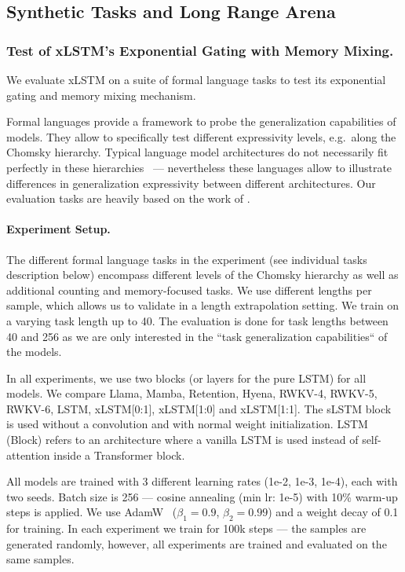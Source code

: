 \documentclass[dvipsnames]{article}
\begin{document}
\begin{appendix}
\subsection{Synthetic Tasks and Long Range Arena}
\label{sec:appExpSynthetic}

\subsubsection{Test of xLSTM's Exponential Gating with Memory Mixing.}\label{sec:appExpSynthetic-formalLang}
We evaluate xLSTM on a suite of formal language tasks to test its exponential gating and memory mixing mechanism.

Formal languages provide a framework to probe the generalization capabilities of models.
They allow to specifically test different expressivity levels, e.g.\ along the Chomsky hierarchy.
Typical language model architectures do not necessarily fit perfectly in these hierarchies~\citep{Deletang:23} --- nevertheless these languages allow to illustrate differences in generalization expressivity between different architectures.
Our evaluation tasks are heavily based on the work of \citet{Deletang:23}.

\paragraph{Experiment Setup.}
The different formal language tasks in the experiment (see individual tasks description below) encompass different levels of the Chomsky hierarchy as well as additional counting and memory-focused tasks.
We use different lengths per sample, which allows us to validate in a length extrapolation setting. 
We train on a varying task length up to 40. The evaluation is done for task lengths between 40 and 256 as we are only interested in the ``task generalization capabilities`` of the models.

In all experiments, we use two blocks (or layers for the pure LSTM) for all models. 
We compare Llama, Mamba, Retention, Hyena, RWKV-4, RWKV-5, RWKV-6, LSTM, xLSTM[0:1], xLSTM[1:0] and xLSTM[1:1].
The sLSTM block is used without a convolution and with normal weight initialization.
LSTM (Block) refers to an architecture where a vanilla LSTM is used instead of self-attention inside a Transformer block.

All models are trained with 3 different learning rates (1e-2, 1e-3, 1e-4), each with two seeds. Batch size is 256 --- cosine annealing (min lr: 1e-5) with 10\% warm-up steps is applied.
We use AdamW~\citep{Loshchilov:19} ($\beta_1 = 0.9$, $\beta_2 = 0.99$) and a weight decay of 0.1 for training.
In each experiment we train for 100k steps --- the samples are generated randomly, however, all experiments are trained and evaluated on the same samples.


\end{appendix}
\end{document}
